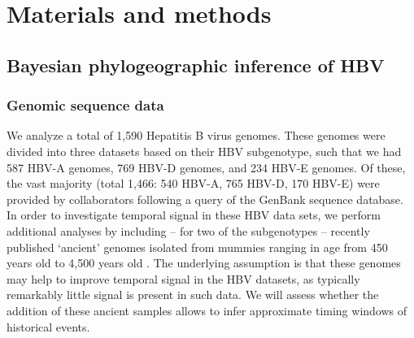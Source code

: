 \chapter{Materials and methods}
\label{ch:methodology}

%

\section{Bayesian phylogeographic inference of HBV}

\subsection{Genomic sequence data}
We analyze a total of 1,590 Hepatitis B virus genomes. %
These genomes were divided into three datasets based on their HBV subgenotype, such that we had 587 HBV-A genomes, 769 HBV-D genomes, and 234 HBV-E genomes.
Of these, the vast majority (total 1,466: 540 HBV-A, 765 HBV-D, 170 HBV-E) were provided by collaborators following a query of the GenBank sequence database. %
In order to investigate temporal signal in these HBV data sets, we perform additional analyses by including -- for two of the subgenotypes -- recently published `ancient' genomes isolated from mummies ranging in age from 450 years old to 4,500 years old \cite{muhlemann, ross}. %
The underlying assumption is that these genomes may help to improve temporal signal in the HBV datasets, as typically remarkably little signal is present in such data.
We will assess whether the addition of these ancient samples allows to infer approximate timing windows of historical events.

